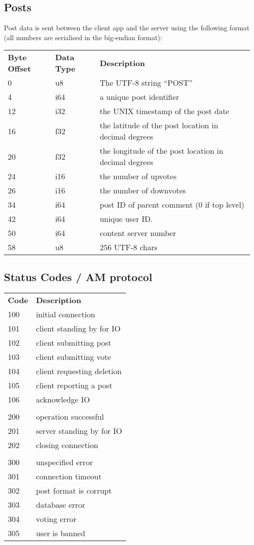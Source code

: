 \documentclass[12pt, a4paper]{article}
\begin{document}
\subsection{Posts}
Post data is sent between the client app and the server using the following format (all numbers are serialised in the big-endian format):
\begin{table}[h]
\centering
\begin{tabular}{lll}
\textbf{Byte Offset} & \textbf{Data Type} &\textbf{Description}\\
0 & u8 & The UTF-8 string ``POST''\\
4 & i64 & a unique post identifier\\
12 & i32 & the UNIX timestamp of the post date\\
16 & f32 & the latitude of the post location in decimal degrees\\
20 & f32 & the longitude of the post location in decimal degrees\\
24 & i16 & the number of upvotes\\
26 & i16 & the number of downvotes\\
34 & i64 & post ID of parent comment (0 if top level)\\
42 & i64 & unique user ID.\\
50 & i64 & content server number\\
58 & u8 & 256 UTF-8 chars \\
\end{tabular}
\end{table}
\clearpage

\subsection{Status Codes / AM protocol}
\begin{table}[h]
\centering
\label{my-label}
\begin{tabular}{ll}
\textbf{Code} &\textbf{Description}\\
100 & initial connection\\
101 & client standing by for IO\\
102 & client submitting post\\
103 & client submitting vote\\
104 & client requesting deletion\\
105 & client reporting a post\\
106 & acknowledge IO\\
&\\
200 & operation successful\\
201 & server standing by for IO\\
202 & closing connection\\
&\\
300 & unspecified error\\
301 & connection timeout\\
302 & post format is corrupt\\
303 & database error\\
304 & voting error\\
305 & user is banned\\
\end{tabular}
\end{table}
\end{document}
